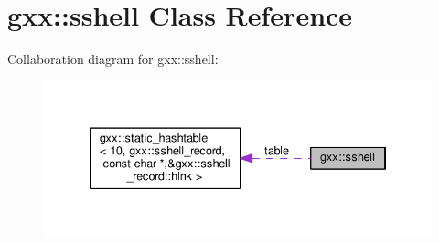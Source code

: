 \hypertarget{classgxx_1_1sshell}{}\section{gxx\+:\+:sshell Class Reference}
\label{classgxx_1_1sshell}


Collaboration diagram for gxx\+:\+:sshell\+:\nopagebreak
\begin{figure}[H]
\begin{center}
\leavevmode
\includegraphics[width=334pt]{classgxx_1_1sshell__coll__graph}
\end{center}
\end{figure}
